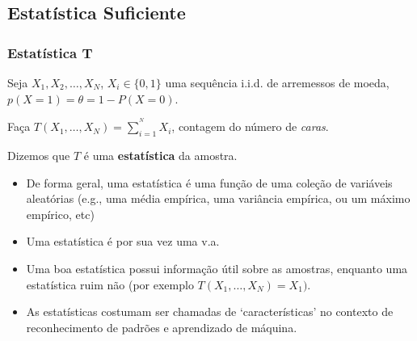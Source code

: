 \subsection{Estatística Suficiente}
\begin{frame}[allowframebreaks]
  \frametitle{Estatística T}

  \begin{example}
  Seja $X_1, X_2, \ldots, X_N$, $X_i \in \{0,1\}$ uma sequência i.i.d. de arremessos de moeda,
  $p(X=1)=\theta = 1 - P(X=0)$.

  Faça $T(X_1,\ldots,X_N) = \sum_{i=1}^{^N} X_i$, contagem do número de \textit{caras}.

  Dizemos que $T$ é uma \textbf{estatística} da amostra.
  \end{example}
  
  \begin{itemize}
  \item De forma geral, uma estatística é uma função de uma coleção de variáveis aleatórias
        (e.g., uma média empírica, uma variância empírica, ou um máximo empírico, etc)
  \item Uma estatística é por sua vez uma v.a.
  \item Uma boa estatística possui informação útil sobre as amostras, enquanto uma 
        estatística ruim não (por exemplo $T(X_1, \ldots, X_N)=X_1)$.
  \item As estatísticas costumam ser chamadas de `características' no contexto de reconhecimento
        de padrões e aprendizado de máquina.
  \end{itemize}
\end{frame}

